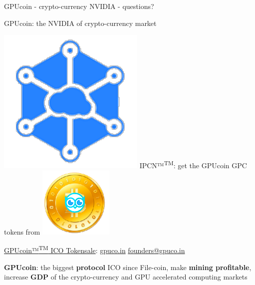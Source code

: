 \documentclass[10pt,handout]{beamer}
\begin{document}
\begin{frame}[standout]{GPUcoin - crypto-currency NVIDIA - questions?}
\begin{center}
GPUcoin: the NVIDIA of crypto-currency market 
\end{center}


\includegraphics[scale=.3]{static/ipcn-p2p}
IPCN™\textsuperscript{TM}: get the GPUcoin GPC tokens from
\includegraphics[scale=0.3]{static/hootcoin} 


 \begin{center}
\href{https://j.mp/gpucoins}{GPUcoin™\textsuperscript{TM} ICO Tokensale}: 
\href{http://gpuco.in}{gpuco.in}
\href{mailto:founders@gpuco.in}{founders@gpuco.in} 
 \end{center}
\begin{center}

\textbf{GPUcoin}: the biggest \textbf{protocol} ICO since File-coin, make \textbf{mining profitable}, increase \textbf{GDP} of the crypto-currency and GPU accelerated computing markets
\end{center}




 \begin{center}\ccbysa\end{center}

\end{frame}
\end{document}
